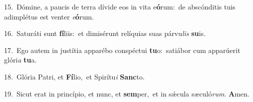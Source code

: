{\numbfont\textcolor{\numbcolor}{15.}}~Dómine, a paucis de terra dívide eos in vita e\-\textbf{ó}\-rum:~\star de abscónditis tuis adimplétus est venter \textit{e}\-\textbf{ó}rum.\par
{\numbfont\textcolor{\numbcolor}{16.}}~Saturáti sunt \textbf{fí}\-liis:~\star et dimisérunt relíquias suas párvu\textit{lis} \textbf{su}\-is.\par
{\numbfont\textcolor{\numbcolor}{17.}}~Ego autem in justítia apparébo conspéctui \textbf{tu}\-o:~\star satiábor cum apparúerit glóri\textit{a} \textbf{tu}\-a.\par
{\numbfont\textcolor{\numbcolor}{18.}}~Glória Patri, et \textbf{Fí}\-lio,~\star et Spirítu\textit{i} \textbf{Sanc}\-to.\par
{\numbfont\textcolor{\numbcolor}{19.}}~Sicut erat in princípio, et nunc, et \textbf{sem}\-per,~\star et in sǽcula sæculó\-\textit{rum}\-. \textbf{A}\-men.\par
